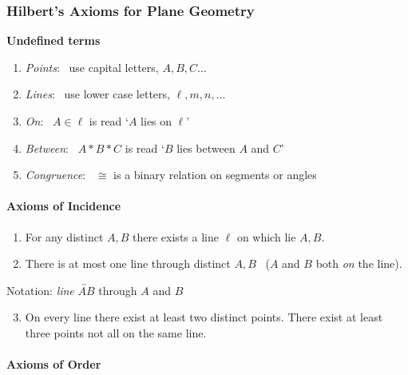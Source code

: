 \twocolumn

\subsubsection*{\centering \large Hilbert's Axioms for Plane Geometry}

\begin{minipage}[t]{0.48\linewidth}\vspace{0pt}
	\textbf{Undefined terms}
	\begin{enumerate}\itemsep2pt
	  \item \emph{Points}: \ use capital letters, $A,B,C\ldots$
	  \item \emph{Lines}: \ use lower case letters, $\ell,m,n,\ldots$
	  \item \emph{On}: \ $A\in\ell$ is read `$A$ lies on $\ell$'
	  \item \emph{Between}: \ $A*B*C$ is read `$B$ lies between $A$ and $C$'
	  \item \emph{Congruence}: \ $\cong$ is a binary relation on segments or angles
	\end{enumerate}
	
	
	\paragraph{Axioms of Incidence}
	
	\begin{enumerate}
		\item[I-1] For any distinct $A,B$ there exists a line $\ell$ on which lie $A,B$.
		\item[I-2] There is at most one line through distinct $A,B$ \ ($A$ and $B$ both \emph{on} the line).
	\end{enumerate}\vspace{-2pt}
		
	Notation: \emph{line} $\overleftrightarrow{AB}$ through $A$ and $B$\vspace{-2pt}
	
	\begin{enumerate}\setcounter{enumi}{2}	
		\item[I-3] On every line there exist at least two distinct points. There exist at least three points not all on the same line.
	\end{enumerate}
	
	
	\paragraph{Axioms of Order}
	

\end{minipage}
